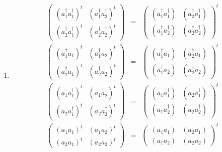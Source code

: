 \documentclass[aps,preprint]{revtex4}
\begin{document}
\begin{enumerate}
\begin{enumerate}
\item 
\begin{eqnarray}
\left( 
\begin{array}{cc}
\left( a_{1}^{\dagger }a_{1}^{\dagger }\right) ^{t} & \left( a_{1}^{\dagger
}a_{2}^{\dagger }\right) ^{t} \\ 
\left( a_{2}^{\dagger }a_{1}^{\dagger }\right) ^{t} & \left( a_{2}^{\dagger
}a_{2}^{\dagger }\right) ^{t}%
\end{array}%
\right) &=&\left( 
\begin{array}{cc}
\left( a_{1}^{\dagger }a_{1}^{\dagger }\right) & \left( a_{2}^{\dagger
}a_{1}^{\dagger }\right) \\ 
\left( a_{1}^{\dagger }a_{2}^{\dagger }\right) & \left( a_{2}^{\dagger
}a_{2}^{\dagger }\right)%
\end{array}%
\right) ^{t} \\
\left( 
\begin{array}{cc}
\left( a_{1}^{\dagger }a_{1}\right) ^{t} & \left( a_{1}^{\dagger
}a_{2}\right) ^{t} \\ 
\left( a_{2}^{\dagger }a_{1}\right) ^{t} & \left( a_{2}^{\dagger
}a_{2}\right) ^{t}%
\end{array}%
\right) &=&\left( 
\begin{array}{cc}
\left( a_{1}^{\dagger }a_{1}\right) & \left( a_{2}^{\dagger }a_{1}\right) \\ 
\left( a_{1}^{\dagger }a_{2}\right) & \left( a_{2}^{\dagger }a_{2}\right)%
\end{array}%
\right) ^{t} \\
\left( 
\begin{array}{cc}
\left( a_{1}a_{1}^{\dagger }\right) ^{t} & \left( a_{1}a_{2}^{\dagger
}\right) ^{t} \\ 
\left( a_{2}a_{1}^{\dagger }\right) ^{t} & \left( a_{2}a_{2}^{\dagger
}\right) ^{t}%
\end{array}%
\right) &=&\left( 
\begin{array}{cc}
\left( a_{1}a_{1}^{\dagger }\right) & \left( a_{2}a_{1}^{\dagger }\right) \\ 
\left( a_{1}a_{2}^{\dagger }\right) & \left( a_{2}a_{2}^{\dagger }\right)%
\end{array}%
\right) ^{t} \\
\left( 
\begin{array}{cc}
\left( a_{1}a_{1}\right) ^{t} & \left( a_{1}a_{2}\right) ^{t} \\ 
\left( a_{2}a_{1}\right) ^{t} & \left( a_{2}a_{2}\right) ^{t}%
\end{array}%
\right) &=&\left( 
\begin{array}{cc}
\left( a_{1}a_{1}\right) & \left( a_{2}a_{1}\right) \\ 
\left( a_{1}a_{2}\right) & \left( a_{2}a_{2}\right)%
\end{array}%
\right) ^{t}
\end{eqnarray}


\end{enumerate}
\end{enumerate}
\end{document}
